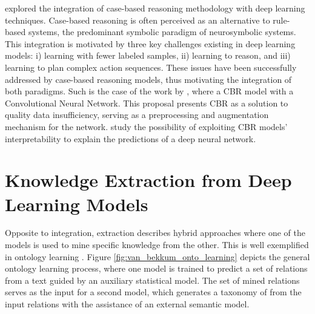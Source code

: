 \cite{leake_bringing_2020} explored the integration of case-based reasoning methodology with deep learning techniques. Case-based reasoning is often perceived as an alternative to rule-based systems, the predominant symbolic paradigm of neurosymbolic systems. This integration is motivated by three key challenges existing in deep learning models: i) learning with fewer labeled samples, ii) learning to reason, and iii) learning to plan complex action sequences. These issues have been successfully addressed by case-based reasoning models, thus motivating the integration of both paradigms. Such is the case of the work by \cite{marie_segmentation_2019}, where a CBR model with a Convolutional Neural Network. This proposal presents CBR as a solution to quality data insufficiency, serving as a preprocessing and augmentation mechanism for the network. \cite{lamy_explainable_2019} study the possibility of exploiting CBR models' interpretability to explain the predictions of a deep neural network.






\section{Knowledge Extraction from Deep Learning Models}
Opposite to integration, extraction describes hybrid approaches where one of the models is used to mine specific knowledge from the other. This is well exemplified in ontology learning \citep{Bouraoui_Jameel_Schockaert_2017,wong_ontology_2012,asim_ontology_2018}. Figure \ref{fig:van_bekkum_onto_learning} depicts the general ontology learning process, where one model is trained to predict a set of relations from a text guided by an auxiliary statistical model. The set of mined relations serves as the input for a second model, which generates a taxonomy of from the input relations with the assistance of an external semantic model. 

